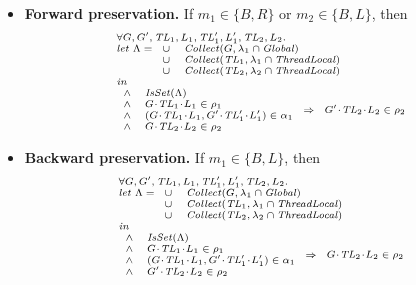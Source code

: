 \begin{itemize}
\item {\bf Forward preservation.}
If $m_1 \in \{B,R\}$ or $m_2 \in \{B,L\}$, then 
\[
\scriptsize{
\begin{array}{l}
\forall \varsG,\varsG',\varsTL_1,\varsL_1,\varsTL'_1,\varsL'_1,\varsTL_2,\varsL_2. \\
\mathit{let}\ \Lambda =
\begin{array}[t]{ll}
\cup & \Collect(\varsG, \lins_1 \cap \Global) \\
\cup & \Collect(\varsTL_1, \lins_1 \cap \ThreadLocal) \\
\cup & \Collect(\varsTL_2, \lins_2 \cap \ThreadLocal) 
\end{array} \\
\mathit{in} \\
\begin{array}{ll}
\wedge & \IsSet(\Lambda) \\
\wedge & \MakeStore{\varsG}{\varsTL_1}{\varsL_1} \in \rho_1 \\
\wedge & (\MakeStore{\varsG}{\varsTL_1}{\varsL_1},\MakeStore{\varsG'}{\varsTL'_1}{\varsL'_1}) \in \alpha_1 \\
\wedge & \MakeStore{\varsG}{\varsTL_2}{\varsL_2} \in \rho_2 \\
\end{array} 
\Rightarrow 
\begin{array}{l}
\MakeStore{\varsG'}{\varsTL_2}{\varsL_2} \in \rho_2 
\end{array}
\end{array}
}
\]

\item {\bf Backward preservation.}
If $m_1 \in \{B,L\}$, then 
\[
\scriptsize{
\begin{array}{l}
\forall \varsG,\varsG',\varsTL_1,\varsL_1,\varsTL'_1,\varsL'_1,\varsTL_2,\varsL_2. \\
\mathit{let}\ \Lambda =
\begin{array}[t]{ll}
\cup & \Collect(\varsG, \lins_1 \cap \Global) \\
\cup & \Collect(\varsTL_1, \lins_1 \cap \ThreadLocal) \\
\cup & \Collect(\varsTL_2, \lins_2 \cap \ThreadLocal) 
\end{array} \\
\mathit{in} \\
\begin{array}{ll}
\wedge & \IsSet(\Lambda) \\
\wedge & \MakeStore{\varsG}{\varsTL_1}{\varsL_1} \in \rho_1 \\
\wedge & (\MakeStore{\varsG}{\varsTL_1}{\varsL_1},\MakeStore{\varsG'}{\varsTL'_1}{\varsL'_1}) \in \alpha_1 \\
\wedge & \MakeStore{\varsG'}{\varsTL_2}{\varsL_2} \in \rho_2 \\
\end{array} 
\Rightarrow 
\begin{array}{l}
\MakeStore{\varsG}{\varsTL_2}{\varsL_2} \in \rho_2 
\end{array}
\end{array}
}
\]


\end{itemize}
